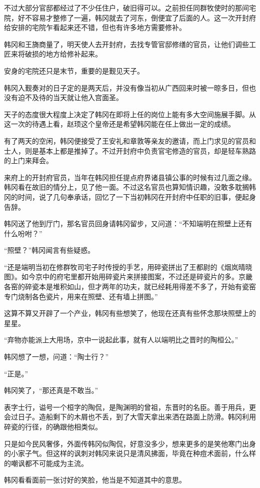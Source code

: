 不过大部分官邸都经过了不少任住户，破旧得可以。之前担任同群牧使时的那间宅院，好不容易才整修了一遍，韩冈就去了河东，倒便宜了后面的人。这一次开封府给安排的宅院乍看起来还不错，但也有许多地方需要修补。

韩冈和王旖商量了，明天使人去开封府，去找专管官邸修缮的官员，让他们调些工匠来将破损的地方给修补起来。

安身的宅院还只是末节，重要的是觐见天子。

韩冈入觐奏对的日子定的是两天后，并没有像当初从广西回来时被一晾多日，但也没有迫不及待的当天就让他入宫面圣。

天子的态度很大程度上决定了韩冈在即将上任的岗位上能有多大空间施展手脚。从这一次的待遇上看，赵顼这个皇帝还是希望韩冈能在任上做出一定的成绩。

有了两天的空闲，韩冈便接受了王安礼和章敦等亲友的邀请，而上门求见的官员和士人，则是基本上都是推掉了。不过开封府中负责官宅修造的官员，却是轻车熟路的上门来拜会。

来府上的开封府官员，当年在韩冈担任提点府界诸县镇公事的时候有过几面之缘。韩冈看在故旧的情分上，见了他一面。不过这名官员也算知情识趣，没敢多耽搁韩冈的时间，说了几句奉承话，回忆了一下当初韩冈在开封府中任职的旧事，便起身告辞。

韩冈送了他到厅门，那名官员回身请韩冈留步，又问道：“不知端明在照壁上还有什么吩咐？”

“照壁？”韩冈闻言有些疑惑。

“还是端明当初在修群牧司宅子时传授的手艺，用碎瓷拼出了王都尉的《烟岚晴晓图》。如今京中的府宅里都开始用碎瓷片来拼接图案，不过还是碎瓷片的多。京畿各窑的碎瓷本是堆积如山，但才两年的功夫，就已经耗用得差不多了，开始有瓷窑专门烧制各色瓷片，用来在照壁、还有墙上拼图。”

这算不算又开辟了一个产业，韩冈有些想笑了，他现在还真有些怀念那块照壁上的星星。

“弃物亦能派上大用场，京中一说起此事，就有人以端明比之晋时的陶桓公。”

韩冈想了一想，问道：“陶士行？”

“正是。”

韩冈笑了，“那还真是不敢当。”

表字士行，谥号一个桓字的陶侃，是陶渊明的曾祖，东晋时的名臣。善于用兵，更会过日子。造船剩下的木屑也不丢，到了大雪天拿出来洒在路面上防滑。韩冈利用碎瓷的行径，的确跟他相类似。

只是如今民风奢侈，外面传韩冈似陶侃，好意没多少，想来更多的是笑他寒门出身的小家子气。但这样的讽刺对韩冈来说只是清风拂面，毕竟在种痘术面前，什么样的嘲讽都不可能成为主流。

韩冈看看面前一张讨好的笑脸，他当是不知道其中的意思。

